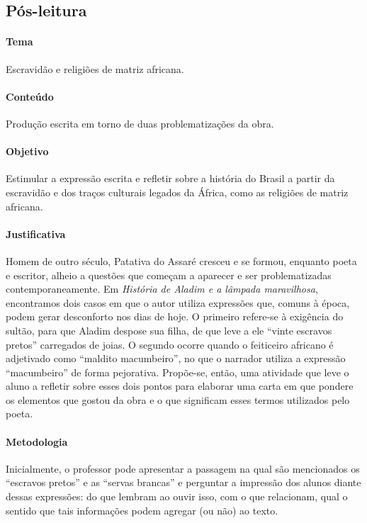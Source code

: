 \documentclass[11pt]{extarticle}
\begin{document}
\subsection{Pós-leitura}


\paragraph{Tema} Escravidão e religiões de matriz africana.

\paragraph{Conteúdo} Produção escrita em torno de duas problematizações da obra.

\paragraph{Objetivo} Estimular a expressão escrita e refletir sobre a história do Brasil a partir da escravidão e dos traços culturais legados da África, como as religiões de matriz africana.

\paragraph{Justificativa} Homem de outro século, Patativa do Assaré cresceu e se formou, enquanto poeta e escritor, alheio a questões que começam a aparecer e ser problematizadas contemporaneamente. Em \textit{História de Aladim e a lâmpada maravilhosa}, encontramos dois casos em que o autor utiliza expressões que, comuns à época, podem gerar desconforto nos dias de hoje. O primeiro refere-se à exigência do sultão, para que Aladim despose sua filha, de que leve a ele ``vinte escravos pretos'' carregados de joias. O segundo ocorre quando o feiticeiro africano é adjetivado como ``maldito macumbeiro'', no que o narrador utiliza a expressão ``macumbeiro'' de forma pejorativa.
Propõe-se, então, uma atividade que leve o aluno a refletir sobre esses dois pontos para elaborar uma carta em que pondere os elementos que gostou da obra e o que significam esses termos utilizados pelo poeta.


\paragraph{Metodologia} Inicialmente, o professor pode apresentar a passagem na qual são mencionados os ``escravos pretos'' e as ``servas brancas'' e perguntar a impressão dos alunos diante dessas expressões: do que lembram ao ouvir isso, com o que relacionam, qual o sentido que tais informações podem agregar (ou não) ao texto.
\end{document}
